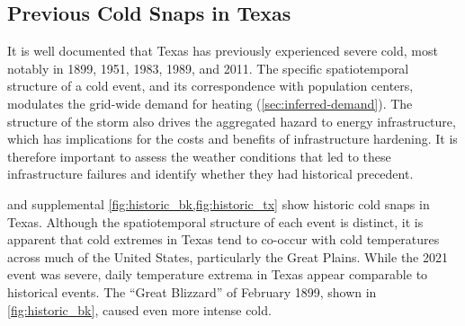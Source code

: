 \documentclass[12pt]{iopart}
\begin{document}
\subsection{Previous Cold Snaps in Texas}

It is well documented that Texas has previously experienced severe cold, most notably in 1899, 1951, 1983, 1989, and 2011.
The specific spatiotemporal structure of a cold event, and its correspondence with population centers, modulates the grid-wide demand for heating (\cref{sec:inferred-demand}).
The structure of the storm also drives the aggregated hazard to energy infrastructure, which has implications for the costs and benefits of infrastructure hardening.
It is therefore important to assess the weather conditions that led to these infrastructure failures and identify whether they had historical precedent.

 and supplemental \cref{fig:historic_bk,fig:historic_tx} show historic cold snaps in Texas.
Although the spatiotemporal structure of each event is distinct, it is apparent that cold extremes in Texas tend to co-occur with cold temperatures across much of the United States, particularly the Great Plains.
While the 2021 event was severe, daily temperature extrema in Texas appear comparable to historical events.
The ``Great Blizzard'' of February 1899, shown in \cref{fig:historic_bk}, caused even more intense cold.
\end{document}
